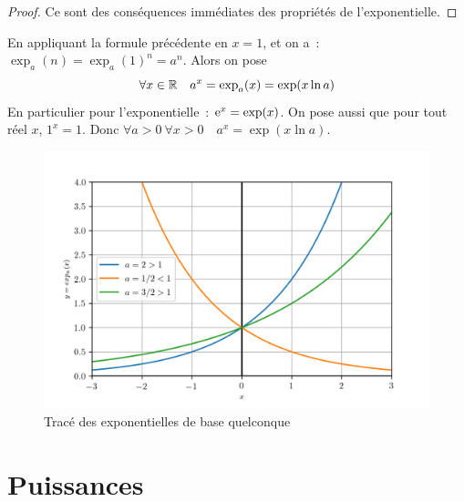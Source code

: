 \begin{proof}
  Ce sont des conséquences immédiates des propriétés de l'exponentielle.
\end{proof}
%
En appliquant la formule précédente en $x=1$, et on a~: $\exp_a(n)=\exp_a(1)^n=a^n$. Alors on pose
\begin{equation}
  \forall x \in \mathbb{R} \quad a^x=\exp_a(x)=\exp(x \ln a)
\end{equation}
En particulier pour l'exponentielle~: $\operatorname{e}^x=\exp(x)$. On pose aussi que pour tout réel $x$, $1^x=1$. Donc $\forall a>0 \ \forall x>0 \quad a^x=\exp(x \ln a)$.
%
\begin{figure}
  \centering
  \includegraphics[scale=0.6]{expa.png}
  \caption{Tracé des exponentielles de base quelconque}
  \label{fig:traceexpa}
\end{figure}
%
\section{Puissances}
\label{sec:chap1-puissances}
